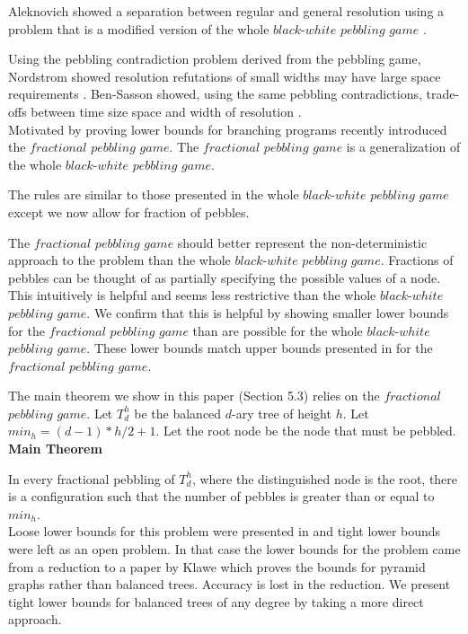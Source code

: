 \documentclass[12pt]{article}
\begin{document}
Aleknovich showed a separation between regular and general resolution using a problem that is a modified version of the whole $black$-$white$ $pebbling$ $game$ \cite{alek:sepres}.

Using the pebbling contradiction problem derived from the pebbling game, Nordstrom showed resolution refutations of small widths may have large space requirements \cite{n:narrowpf}. Ben-Sasson showed, using the same pebbling contradictions, trade-offs between time size space and width of resolution \cite{bs:wsstrade}.\\



Motivated by proving lower bounds for branching programs \cite{c:pebjournal} recently introduced the $fractional$ $pebbling$ $game$. The $fractional $ $pebbling$ $game$ is a generalization of the whole $black$-$white$ $pebbling$ $game$. 

The rules are similar to those presented in the whole $black$-$white$ $pebbling$ $game$ except we now allow for fraction of pebbles. 

The $fractional $ $pebbling$ $game$ should better represent the non-deterministic approach to the problem than the whole $black$-$white$ $pebbling$ $game$. Fractions of pebbles can be thought of as partially specifying the possible values of a node. This intuitively is helpful and seems less restrictive than the whole $black$-$white$ $pebbling$ $game$. We confirm that this is helpful by showing smaller lower bounds for the $fractional $ $pebbling$ $game$ than are possible for the whole $black$-$white$ $pebbling$ $game$. These lower bounds match upper bounds presented in \cite{c:pebjournal} for the $fractional $ $pebbling$ $game$.

The main theorem we show in this paper (Section 5.3) relies on the $fractional$ $pebbling$ $game$. Let  $T^h_d$ be the balanced $d$-ary tree of height $h$. Let $min_h = (d-1) * h/2+1$. Let the root node be the node that must be pebbled. \\

\noindent
{\bf Main Theorem}

\noindent
In every fractional pebbling of $T^h_d$, where the distinguished node is the root, there is a configuration such
that the number of pebbles is greater than or equal to $min_h$.\\

Loose lower bounds for this problem were presented in \cite{c:pebjournal} and tight lower bounds were left as an open problem. In that case the lower bounds for the problem came from a reduction to a paper by Klawe \cite{k:bwpyr} which proves the bounds for pyramid graphs rather than balanced trees. Accuracy is lost in the reduction. We present tight lower bounds for balanced trees of any degree by taking a more direct approach.
\end{document}
